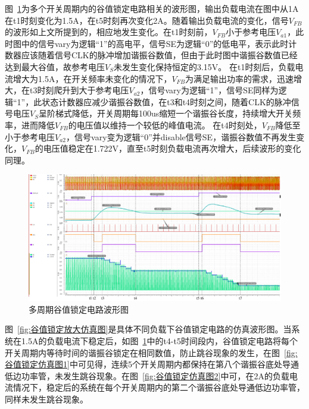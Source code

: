 图~\ref{fig:多周期谷值锁定电路波形图}为多个开关周期内的谷值锁定电路相关的波形图，输出负载电流在图中从1A在t1时刻变化为1.5A，在t5时刻再次变化2A。随着输出负载电流的变化，信号$V_{FB}$的波形如上文所提到的，相应地发生变化。在t1时刻前，$V_{FB}$小于参考电压$V_{a1}$，此时图中的信号vary为逻辑“1”的高电平，信号SE为逻辑“0”的低电平，表示此时计数器应该随着信号CLK的脉冲增加谐振谷数值，但由于此时图中谐振谷数值已经达到最大谷值，故参考电压$V_S$未发生变化保持恒定的3.15V。
在t1时刻后，负载电流增大为1.5A，在开关频率未变化的情况下，$V_{FB}$为满足输出功率的需求，迅速增大，在t3时刻爬升到大于参考电压$V_{a2}$，信号vary为逻辑“1”，信号SE同样为逻辑“1”，此状态计数器应减少谐振谷数值，在t3和t4时刻之间，随着CLK的脉冲信号电压$V_S$呈阶梯式降低，开关周期每100us缩短一个谐振谷长度，持续增大开关频率，进而降低$V_{FB}$的电压值以维持一个较低的峰值电流。
在t4时刻处，$V_{FB}$降低至小于参考电压$V_{a2}$，信号vary变为逻辑“0”并disable信号SE，谐振谷数值不再发生变化，$V_{FB}$的电压值稳定在1.722V，直至t5时刻负载电流再次增大，后续波形的变化同理。

\begin{figure}[htbp] 
    \centering
    \includegraphics[width=0.8\linewidth]{figures/valley_lock1.pdf}
    \caption{多周期谷值锁定电路波形图}
    \label{fig:多周期谷值锁定电路波形图}
\end{figure} 

图~\ref{fig:谷值锁定放大仿真图}是具体不同负载下谷值锁定电路的仿真波形图。当系统在1.5A的负载电流下稳定后，如图~\ref{fig:多周期谷值锁定电路波形图}中的t4-t5时间段内，谷值锁定电路将每个开关周期内等待时间的谐振谷锁定在相同数值，防止跳谷现象的发生，在图~\ref{fig:谷值锁定仿真图1}中可见得，连续5个开关周期内都保持在第八个谐振谷底处导通低边功率管，未发生跳谷现象。在图~\ref{fig:谷值锁定仿真图2}中可，在2A的负载电流情况下，稳定后的系统在每个开关周期内的第二个谐振谷底处导通低边功率管，同样未发生跳谷现象。

